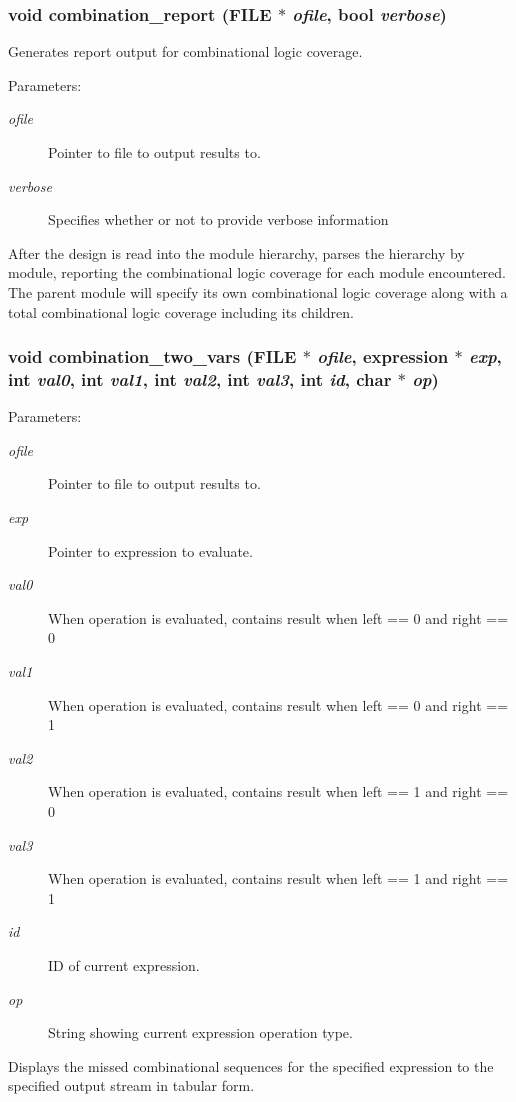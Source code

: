 \subsubsection{\setlength{\rightskip}{0pt plus 5cm}void combination\_\-report (FILE $\ast$ {\em ofile}, {\bf bool} {\em verbose})}\label{comb_8c_a21}


Generates report output for combinational logic coverage.

\begin{Desc}
\item[Parameters: ]\par
\begin{description}
\item[{\em 
ofile}]Pointer to file to output results to. \item[{\em 
verbose}]Specifies whether or not to provide verbose information\end{description}
\end{Desc}
After the design is read into the module hierarchy, parses the hierarchy by module, reporting the combinational logic coverage for each module encountered. The parent  module will specify its own combinational logic coverage along with a total combinational logic coverage including its children. 
\subsubsection{\setlength{\rightskip}{0pt plus 5cm}void combination\_\-two\_\-vars (FILE $\ast$ {\em ofile}, {\bf expression} $\ast$ {\em exp}, int {\em val0}, int {\em val1}, int {\em val2}, int {\em val3}, int {\em id}, char $\ast$ {\em op})}\label{comb_8c_a15}


\begin{Desc}
\item[Parameters: ]\par
\begin{description}
\item[{\em 
ofile}]Pointer to file to output results to. \item[{\em 
exp}]Pointer to expression to evaluate. \item[{\em 
val0}]When operation is evaluated, contains result when left == 0 and right == 0 \item[{\em 
val1}]When operation is evaluated, contains result when left == 0 and right == 1 \item[{\em 
val2}]When operation is evaluated, contains result when left == 1 and right == 0 \item[{\em 
val3}]When operation is evaluated, contains result when left == 1 and right == 1 \item[{\em 
id}]ID of current expression. \item[{\em 
op}]String showing current expression operation type.\end{description}
\end{Desc}
Displays the missed combinational sequences for the specified expression to the specified output stream in tabular form. 
